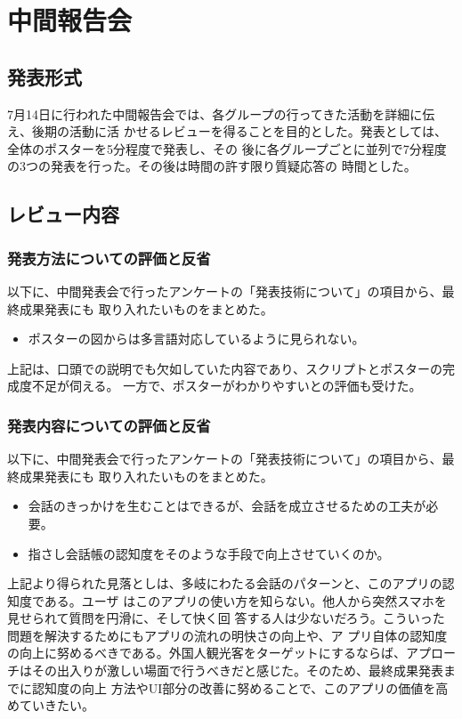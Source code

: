 \documentclass[12pt,papersize]{jsbook}
\begin{document}
\chapter{中間報告会}

\section{発表形式}
7月14日に行われた中間報告会では、各グループの行ってきた活動を詳細に伝え、後期の活動に活
かせるレビューを得ることを目的とした。発表としては、全体のポスターを5分程度で発表し、その
後に各グループごとに並列で7分程度の3つの発表を行った。その後は時間の許す限り質疑応答の
時間とした。

\section{レビュー内容}
\subsection{発表方法についての評価と反省}
以下に、中間発表会で行ったアンケートの「発表技術について」の項目から、最終成果発表にも
取り入れたいものをまとめた。
\begin{itemize}
 \item ポスターの図からは多言語対応しているように見られない。
\end{itemize}
上記は、口頭での説明でも欠如していた内容であり、スクリプトとポスターの完成度不足が伺える。
一方で、ポスターがわかりやすいとの評価も受けた。
\subsection{発表内容についての評価と反省}
以下に、中間発表会で行ったアンケートの「発表技術について」の項目から、最終成果発表にも
取り入れたいものをまとめた。
\begin{itemize}
 \item 会話のきっかけを生むことはできるが、会話を成立させるための工夫が必要。
 \item 指さし会話帳の認知度をそのような手段で向上させていくのか。
\end{itemize}
上記より得られた見落としは、多岐にわたる会話のパターンと、このアプリの認知度である。ユーザ
はこのアプリの使い方を知らない。他人から突然スマホを見せられて質問を円滑に、そして快く回
答する人は少ないだろう。こういった問題を解決するためにもアプリの流れの明快さの向上や、ア
プリ自体の認知度の向上に努めるべきである。外国人観光客をターゲットにするならば、アプロー
チはその出入りが激しい場面で行うべきだと感じた。そのため、最終成果発表までに認知度の向上
方法やUI部分の改善に努めることで、このアプリの価値を高めていきたい。
\end{document}
